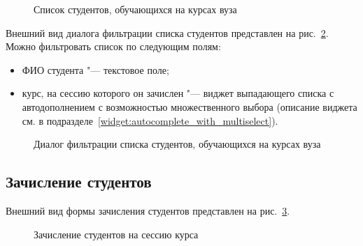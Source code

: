 \begin{figure}[H]
	\caption{Список студентов, обучающихся на курсах вуза}
	\label{img:student:enrolled_list}
\end{figure}

Внешний вид диалога фильтрации списка студентов представлен на рис.~\ref{img:student:enrolled_list_filter}.
Можно фильтровать список по следующим полям:
\begin{itemize}
	\item ФИО студента "--- текстовое поле;
	\item курс, на сессию которого он зачислен "--- виджет выпадающего списка с автодополнением с возможностью 
	множественного выбора (описание виджета см. в подразделе~\ref{widget:autocomplete_with_multiselect}).
\end{itemize}

\begin{figure}[H]
	\caption{Диалог фильтрации списка студентов, обучающихся на курсах вуза}
	\label{img:student:enrolled_list_filter}
\end{figure}

\subsection{Зачисление студентов}
Внешний вид формы зачисления студентов представлен на рис.~\ref{img:student:enroll}. 

\begin{figure}[H]
	\caption{Зачисление студентов на сессию курса}
	\label{img:student:enroll}
\end{figure}

